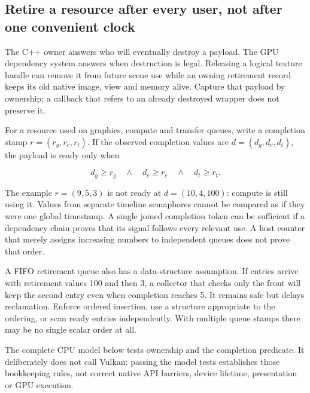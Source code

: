 \subsection{Retire a resource after every user, not after one convenient clock}\label{01-foundations-i-ch011-retire-a-resource-after-every-user-not-after-one-convenient-clock}

The C++ owner answers who will eventually destroy a payload. The GPU dependency system answers when destruction is legal. Releasing a logical texture handle can remove it from future scene use while an owning retirement record keeps its old native image, view and memory alive. Capture that payload by ownership; a callback that refers to an already destroyed wrapper does not preserve it.

For a resource used on graphics, compute and transfer queues, write a completion stamp \(r=(r_g,r_c,r_t)\). If the observed completion values are \(d=(d_g,d_c,d_t)\), the payload is ready only when

\[
d_g\ge r_g\quad\land\quad d_c\ge r_c\quad\land\quad d_t\ge r_t.
\]

The example \(r=(9,5,3)\) is not ready at \(d=(10,4,100)\): compute is still using it. Values from separate timeline semaphores cannot be compared as if they were one global timestamp. A single joined completion token can be sufficient if a dependency chain proves that its signal follows every relevant use. A host counter that merely assigns increasing numbers to independent queues does not prove that order.

A FIFO retirement queue also has a data-structure assumption. If entries arrive with retirement values 100 and then 3, a collector that checks only the front will keep the second entry even when completion reaches 5. It remains safe but delays reclamation. Enforce ordered insertion, use a structure appropriate to the ordering, or scan ready entries independently. With multiple queue stamps there may be no single scalar order at all.

The complete CPU model below tests ownership and the completion predicate. It deliberately does not call Vulkan: passing the model tests establishes those bookkeeping rules, not correct native API barriers, device lifetime, presentation or GPU execution.

